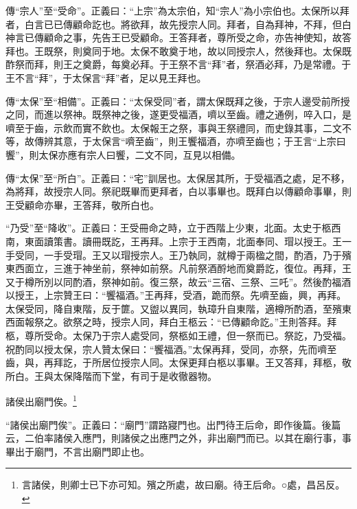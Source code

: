 {\noindent\zhuan{}\fzbyks 傳“宗人”至“受命”。正義曰：“上宗”為太宗伯，知“宗人”為小宗伯也。太保所以拜者，白言已已傳顧命訖也。將欲拜，故先授宗人同。拜者，自為拜神，不拜，但白神言已傳顧命之事，先告王已受顧命。王答拜者，尊所受之命，亦告神使知，故答拜也。王既祭，則奠同于地。太保不敢奠于地，故以同授宗人，然後拜也。太保既酢祭而拜，則王之奠爵，每奠必拜。于王祭不言“拜”者，祭酒必拜，乃是常禮。于王不言“拜”，于太保言“拜”者，足以見王拜也。 \par}

{\noindent\zhuan{}\fzbyks 傳“太保”至“相備”。正義曰：“太保受同”者，謂太保既拜之後，于宗人邊受前所授之同，而進以祭神。既祭神之後，遂更受福酒，嚌以至齒。禮之通例，啐入口，是嚌至于齒，示飲而實不飲也。太保報王之祭，事與王祭禮同，而史錄其事，二文不等，故傳辨其意，于太保言“嚌至齒”，則王饗福酒，亦嚌至齒也；于王言“上宗曰饗”，則太保亦應有宗人曰饗，二文不同，互見以相備。 \par}

{\noindent\zhuan{}\fzbyks 傳“太保”至“所白”。正義曰：“宅”訓居也。太保居其所，于受福酒之處，足不移，為將拜，故授宗人同。祭祀既畢而更拜者，白以事畢也。既拜白以傳顧命事畢，則王受顧命亦畢，王答拜，敬所白也。 \par}

{\noindent\shu{}\fzkt “乃受”至“降收”。正義曰：王受冊命之時，立于西階上少東，北面。太史于柩西南，東面讀策書。讀冊既訖，王再拜。上宗于王西南，北面奉同、瑁以授王。王一手受同，一手受瑁。王又以瑁授宗人。王乃執同，就樽于兩楹之間，酌酒，乃于殯東西面立，三進于神坐前，祭神如前祭。凡前祭酒酹地而奠爵訖，復位。再拜，王又于樽所別以同酌酒，祭神如前。復三祭，故云“三宿、三祭、三吒”。然後酌福酒以授王，上宗贊王曰：“饗福酒。”王再拜，受酒，跪而祭。先嚌至齒，興，再拜。太保受同，降自東階，反于篚。又盥以異同，執璋升自東階，適樽所酌酒，至殯東西面報祭之。欲祭之時，授宗人同，拜白王柩云：“已傳顧命訖。”王則答拜。拜柩，尊所受命。太保乃于宗人處受同，祭柩如王禮，但一祭而已。祭訖，乃受福。祝酌同以授太保，宗人贊太保曰：“饗福酒。”太保再拜，受同，亦祭，先而嚌至齒，與，再拜訖，于所居位授宗人同。太保更拜白柩以事畢。王又答拜，拜柩，敬所白。王與太保降階而下堂，有司于是收徹器物。 \par}

諸侯出廟門俟。\footnote{言諸侯，則卿士已下亦可知。殯之所處，故曰廟。待王后命。○處，昌呂反。}

{\noindent\shu{}\fzkt “諸侯出廟門俟”。正義曰：“廟門”謂路寢門也。出門待王后命，即作後篇。後篇云，二伯率諸侯入應門，則諸侯之出應門之外，非出廟門而已。以其在廟行事，事畢出于廟門，不言出廟門即止也。 \par}

